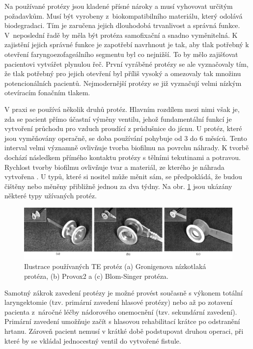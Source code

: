 Na používané protézy jsou kladené
přísné nároky a musí vyhovovat určitým požadavkům. Musí být vyrobeny
z~biokompatibilního materiálu, který odolává biodegradaci. Tím je zaručena jejich
dlouhodobá trvanlivost a správná funkce. V~neposlední řadě by měla být protéza
samofixační a snadno vyměnitelná.
 K zajistění jejich správné funkce je zapotřebí navrhnout je tak, aby
tlak potřebný k otevření faryngoezofageálního segmentu byl co nejnižší. To by mělo zajišťovat pacientovi vytvářet
plynulou řeč. První vyráběné protézy se ale vyznačovaly tím, že tlak potřebný pro jejich otevření byl příliš vysoký a omezovaly tak množinu potencionálních pacientů. Nejmodernější protézy se již vyznačují
velmi nízkým otevíracím fonačním tlakem. 

V praxi se používá několik druhů protéz. Hlavním rozdílem mezi nimi však je,
zda se pacient přímo účastní výměny ventilu, jehož fundamentální funkcí je
vytvoření průchodu pro vzduch proudící z průdušnice do jícnu. U protéz, které
jsou vyměňovány operačně, se doba používání pohybuje od 3 do 6 měsíců. Tento
interval velmi významně ovlivňuje tvorba biofilmu na povrchu náhrady. K tvorbě
dochází následkem přímého kontaktu protézy s tělními tekutinami a potravou.
Rychlost tvorby biofilmu ovlivňuje tvar a materiál, ze kterého je náhrada
vytvořena \cite{Leunisse2001}. U typů, které si nositel může měnit sám, se
předpokládá, že budou čištěny nebo měněny přibližně jednou za dva týdny. Na obr. \ref{fig:cause:treatment:prosthesis} jsou
ukázány některé typy užívaných protéz. 

\begin{figure}[htb]
  \begin{center}
    \includegraphics[width=0.9\linewidth]{ch3-cause/figures/te-protezy}
    \caption[Ilustrace používaných TE protéz.]{Ilustrace používaných TE protéz (a) Gronigenova nízkotlaká protéza, (b) Provox2 a (c) Blom-Singer protéza.}
    \label{fig:cause:treatment:prosthesis}
  \end{center}
\end{figure}


Samotný zákrok zavedení protézy je možné provést současně s výkonem totální
laryngektomie (tzv. primární zavedení hlasové protézy) nebo až po zotavení
pacienta z~náročné léčby nádorového onemocnění (tzv. sekundární zavedení).
Primární zavedení umožňuje začít s hlasovou rehabilitací krátce po odstranění
hrtanu. Zároveň pacient nemusí v krátké době podstupovat druhou operaci, při
které by se vkládal jednocestný ventil do vytvořené fistule.



